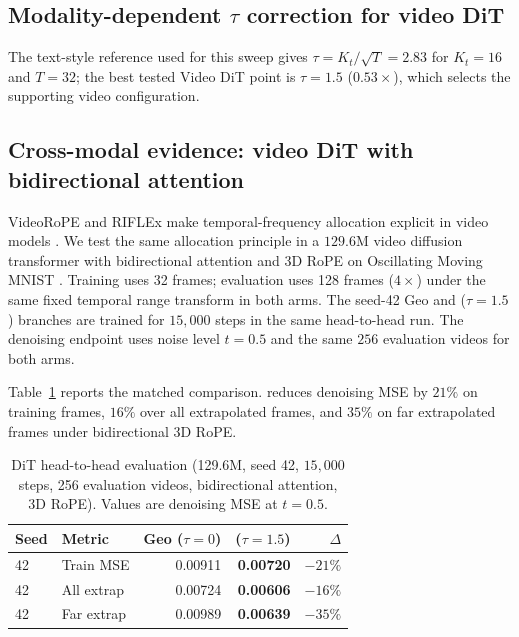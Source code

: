

\FloatBarrier
\subsection{Modality-dependent \texorpdfstring{$\tau$}{tau} correction for video DiT}
\label{sec:tau-correction}

The text-style reference used for this sweep gives
$\tau{=}K_t/\sqrt{T}=2.83$ for $K_t{=}16$ and $T{=}32$; the best tested
Video DiT point is $\tau{=}1.5$ ($0.53\times$), which selects the supporting
video configuration.

\FloatBarrier
\subsection{Cross-modal evidence: video DiT with bidirectional attention}
\label{sec:video-dit}

VideoRoPE and RIFLEx make temporal-frequency allocation explicit in video
models \citep{videorope2025,zhao2025riflex}. We test the same allocation
principle in a $129.6$M video diffusion transformer with bidirectional attention
and 3D RoPE on Oscillating Moving MNIST
\citep{srivastava2015unsupervised}. Training uses 32 frames; evaluation uses
128 frames ($4\times$) under the same fixed temporal range transform in both
arms. The seed-42 Geo and \evq{} ($\tau{=}1.5$) branches are trained for
$15{,}000$ steps in the same head-to-head run. The denoising endpoint uses
noise level $t{=}0.5$ and the same $256$ evaluation videos for both arms.

Table~\ref{tab:dit-h2h} reports the matched comparison. \evq{} reduces
denoising MSE by $21\%$ on training frames, $16\%$ over all extrapolated
frames, and $35\%$ on far extrapolated frames under bidirectional 3D RoPE.

\begin{table}[ht]
\caption{DiT head-to-head evaluation (129.6M, seed 42, $15{,}000$ steps,
256 evaluation videos, bidirectional attention, 3D RoPE). Values are denoising
MSE at $t{=}0.5$.}
\label{tab:dit-h2h}
\centering
\small
\begin{tabular}{@{}l l r r r@{}}
\toprule
Seed & Metric & Geo ($\tau{=}0$) & \evq{} ($\tau{=}1.5$) & $\Delta$ \\
\midrule
42 & Train MSE & 0.00911 & \textbf{0.00720} & $-21\%$ \\
42 & All extrap & 0.00724 & \textbf{0.00606} & $-16\%$ \\
42 & Far extrap & 0.00989 & \textbf{0.00639} & $-35\%$ \\
\bottomrule
\end{tabular}
\end{table}

